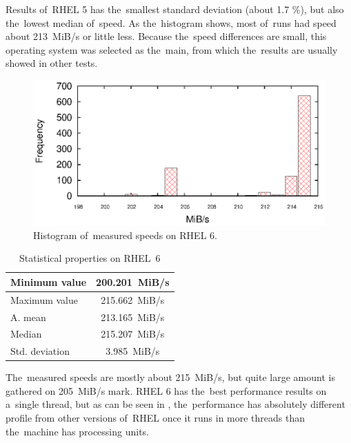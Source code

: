 \par{
Results of~RHEL 5 has the~smallest standard deviation (about 1.7 \%), but also the~lowest median of~speed. As the~histogram shows, most of~runs had speed about 213~MiB/s or little less. Because the~speed differences are small, this operating system was selected as the~main, from which the~results are usually showed in other tests.
}

\begin{figure}[h!]
  \centering
 \includegraphics[width=12cm]{fig/tests/scattering_rhel6.eps} %
\caption{Histogram of~measured speeds on RHEL 6.}
\label{fig:testing:stability-r6}
\end{figure}

\begin{table}[h!]
\begin{center}
\begin{tabular}{|l|c|}
  \hline
  Minimum value& 200.201~MiB/s\\
  \hline
  Maximum value& 215.662~MiB/s\\ 
  \hline
  A. mean & 213.165~MiB/s\\
  \hline
  Median & 215.207~MiB/s\\
  \hline
  Std. deviation & 3.985~MiB/s \\
  \hline
\end{tabular}
\caption{Statistical properties on RHEL~6}
\label{tab:testing:stability-stat-r6}
\end{center}
\end{table}

\par{
The~measured speeds are mostly about 215~MiB/s, but quite large amount is gathered on 205~MiB/s mark. RHEL 6 has the~best performance results on a~single thread, but as can be seen in , the~performance has absolutely different profile from other versions of~RHEL once it runs in more threads than the~machine has processing units.
}

